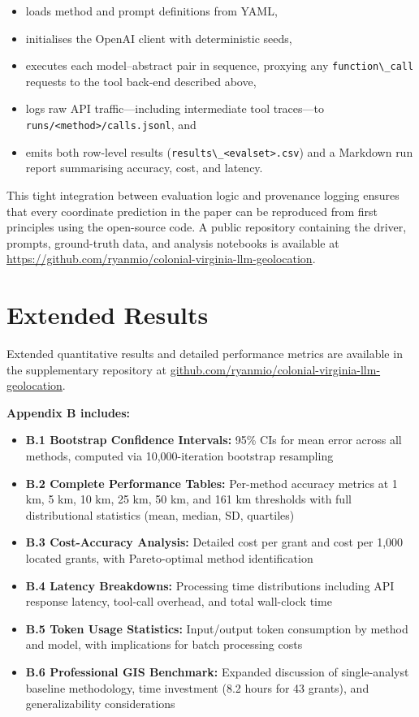 \begin{itemize}
\tightlist
\item
  loads method and prompt definitions from YAML,
\item
  initialises the OpenAI client with deterministic seeds,
\item
  executes each model--abstract pair in sequence, proxying any
  \passthrough{\lstinline!function\_call!} requests to the tool back-end
  described above,
\item
  logs raw API traffic---including intermediate tool traces---to
  \passthrough{\lstinline!runs/<method>/calls.jsonl!}, and
\item
  emits both row-level results
  (\passthrough{\lstinline!results\_<evalset>.csv!}) and a Markdown run
  report summarising accuracy, cost, and latency.
\end{itemize}

This tight integration between evaluation logic and provenance logging
ensures that every coordinate prediction in the paper can be reproduced
from first principles using the open-source code. A public repository
containing the driver, prompts, ground-truth data, and analysis
notebooks is available at
\url{https://github.com/ryanmio/colonial-virginia-llm-geolocation}.

\section{Extended
Results}\label{appendix-b-extended-results}

Extended quantitative results and detailed performance metrics are
available in the supplementary repository at
\href{https://github.com/ryanmio/colonial-virginia-llm-geolocation/blob/main/paper/APPENDIX_B_Extended_Results.md}{github.com/ryanmio/colonial-virginia-llm-geolocation}.

\textbf{Appendix B includes:}

\begin{itemize}
\tightlist
\item
  \textbf{B.1 Bootstrap Confidence Intervals:} 95\% CIs for mean error
  across all methods, computed via 10,000-iteration bootstrap resampling
\item
  \textbf{B.2 Complete Performance Tables:} Per-method accuracy metrics
  at 1 km, 5 km, 10 km, 25 km, 50 km, and 161 km thresholds with full
  distributional statistics (mean, median, SD, quartiles)
\item
  \textbf{B.3 Cost-Accuracy Analysis:} Detailed cost per grant and cost
  per 1,000 located grants, with Pareto-optimal method identification
\item
  \textbf{B.4 Latency Breakdowns:} Processing time distributions
  including API response latency, tool-call overhead, and total
  wall-clock time
\item
  \textbf{B.5 Token Usage Statistics:} Input/output token consumption by
  method and model, with implications for batch processing costs
\item
  \textbf{B.6 Professional GIS Benchmark:} Expanded discussion of
  single-analyst baseline methodology, time investment (8.2 hours for 43
  grants), and generalizability considerations
\end{itemize}

